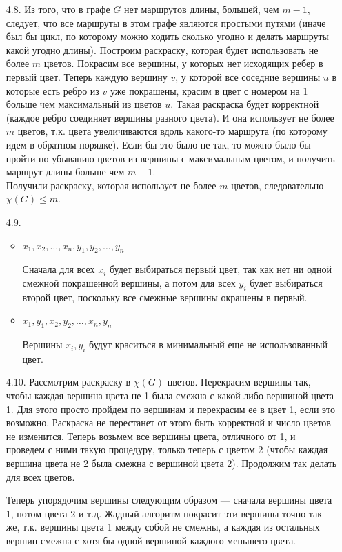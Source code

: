 \documentclass[10pt]{article}
\renewcommand{\leq}{\leqslant}
\begin{document}
\begin{enumerate}
\item[4.8.] Из того, что в графе $G$ нет маршрутов длины, большей, чем $m-1$, следует, что все маршруты в этом графе являются простыми путями (иначе был бы цикл, по которому можно ходить сколько угодно и делать маршруты какой угодно длины). Построим раскраску, которая будет использовать не более $m$ цветов. Покрасим все вершины, у которых нет исходящих ребер в первый цвет. Теперь каждую вершину $v$, у которой все соседние вершины $u$ в которые есть ребро из $v$ уже покрашены, красим в цвет с номером на 1 больше чем максимальный из цветов $u$. Такая раскраска будет корректной (каждое ребро соединяет вершины разного цвета). И она использует не более $m$ цветов, т.к. цвета увеличиваются вдоль какого-то маршрута (по которому идем в обратном порядке). Если бы это было не так, то можно было бы пройти по убыванию цветов из вершины с максимальным цветом, и получить маршрут длины больше чем $m-1$.\\
Получили раскраску, которая использует не более $m$ цветов, следовательно $\chi(G) \leq m$.

\item[4.9.] 
	\begin{itemize}
		\item $x_1, x_2, \ldots, x_n, y_1, y_2, \ldots, y_n$
		
		Сначала для всех $x_i$ будет выбираться первый цвет, так как нет ни одной смежной покрашенной вершины, а потом для всех $y_i$ будет выбираться второй цвет, поскольку все смежные вершины окрашены в первый.
		\item $x_1, y_1, x_2, y_2, \ldots, x_n, y_n$
		
		Вершины $x_i, y_i$ будут краситься в минимальный еще не использованный цвет.
	\end{itemize}

\item[4.10.] Рассмотрим раскраску в $\chi(G)$ цветов. Перекрасим вершины так, чтобы каждая вершина цвета не 1 была смежна с какой-либо вершиной цвета 1. Для этого просто пройдем по вершинам и перекрасим ее в цвет 1, если это возможно. Раскраска не перестанет от этого быть корректной и число цветов не изменится. Теперь возьмем все вершины цвета, отличного от 1, и проведем с ними такую процедуру, только теперь с цветом 2 (чтобы каждая вершина цвета не 2 была смежна с вершиной цвета 2). Продолжим так делать для всех цветов.

Теперь упорядочим вершины следующим образом --- сначала вершины цвета 1, потом цвета 2 и т.д. Жадный алгоритм покрасит эти вершины точно так же, т.к. вершины цвета 1 между собой не смежны, а каждая из остальных вершин смежна с хотя бы одной вершиной каждого меньшего цвета.


\end{enumerate}
\end{document}
